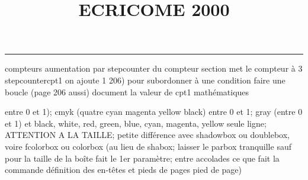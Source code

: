 \documentclass[11pt]{article}%
\title{\bf \vspace{-2cm} ECRICOME 2000} %
\author{} %
\date{} %
\renewcommand{\headrulewidth}{0pt}%
\renewcommand{\footrulewidth}{0.4pt}%
\begin{document}
\maketitle %
\vspace{-1.4cm}\hrule %
\thispagestyle{fancy}

\vspace*{.2cm}



compteurs%
aumentation par stepcounter du compteur section%
met le compteur à 3%
stepcounter{cpt1} on ajoute 1%
206) pour subordonner à une condition %
faire une boucle (page 206 aussi) %
document la valeur de cpt1 
mathématiques\newcommand{\ch}{\operatorname{ch}} 
\newcommand{\sh}{\operatorname{sh}}
\renewcommand{\tanh}{\operatorname{th}}
\renewcommand{\sinh}{\operatorname{sh}}
\renewcommand{\cosh}{\operatorname{ch}}
\newcommand{\argsh}{\operatorname{argsh}}
\newcommand{\argch}{\operatorname{argch}}
\newcommand{\argth}{\operatorname{argth}}
\newcommand{\Id}{\operatorname{Id}}
\renewcommand{\leq}{\leq}
\renewcommand{\geq}{\geq }

\newcommand{\dlim}{\lim}
\newcommand{\dsum}{\sum}
\newcommand{\dint}{\int}
\newcommand{\dprod}{\prod}



entre 0 et 1); cmyk (quatre cyan magenta yellow black) entre 0 et 1;
gray (entre 0 et 1) et black, white, red, green, blue, cyan, magenta,
yellow%
seule ligne; ATTENTION A LA TAILLE; petite différence avec shadowbox ou
doublebox, voire fcolorbox ou colorbox (au lieu de shabox; laisser le
parbox tranquille sauf pour la taille de la boîte
\newcommand{\Tbox}[1]{\begin{center} \shabox{\parbox{0.6
\linewidth}{#1}} \end{center}} %
fait le 1er paramètre; entre accolades ce que fait la commande
définition des en-têtes et pieds de pages\pagestyle{fancy}
\chead{}
\rfoot[ \ \thepage]{\thepage}
\cfoot{}
\lfoot{}
\thispagestyle{fancy} %
pied de page)\renewcommand{\footrulewidth}{0.4pt}
\renewcommand{\headrulewidth}{0.4pt}
\end{document}
